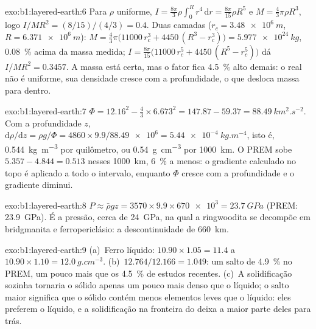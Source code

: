 \begin{solution}{exo:b1:layered-earth:6}
Para $\rho$ uniforme, $I = \tfrac{8\pi}{3}\rho\int_0^R r^4\,\mathrm dr =
\tfrac{8\pi}{15}\rho R^5$ e $M = \tfrac43\pi\rho R^3$, logo
$I/MR^2 = (8/15)/(4/3) = 0.4$. Duas camadas ($r_c = \qty{3.48e6}{m}$,
$R = \qty{6.371e6}{m}$): $M = \tfrac43\pi\bigl(11000\,r_c^3 + 4450\,(R^3 -
r_c^3)\bigr) = \qty{5.977e24}{kg}$, \qty{0.08}{\percent} acima da massa
medida; $I = \tfrac{8\pi}{15}\bigl(11000\,r_c^5 + 4450\,(R^5 - r_c^5)\bigr)$ dá
$I/MR^2 = 0.3457$. A massa está certa, mas o fator fica \qty{4.5}{\percent}
alto demais: o  real não é uniforme, sua densidade cresce com a profundidade, o que
desloca massa para dentro.
\end{solution}

\begin{solution}{exo:b1:layered-earth:7}
$\Phi = 12.16^2 - \tfrac43\times6.673^2 = 147.87 - 59.37 =
\qty{88.49}{km^2.s^{-2}}$. Com a profundidade $z$,
$\mathrm d\rho/\mathrm dz = \rho g/\Phi = 4860\times9.9/\num{88.49e6} =
\qty{5.44e-4}{kg.m^{-4}}$, isto é, \qty{0.544}{kg.m^{-3}} por quilômetro, ou
\qty{0.54}{g.cm^{-3}} por \qty{1000}{km}. O PREM sobe $5.357 - 4.844 =
0.513$ nesses \qty{1000}{km}, \qty{6}{\percent} a menos: o gradiente
calculado no topo é aplicado a todo o intervalo, enquanto $\Phi$ cresce com
a profundidade e o gradiente diminui.
\end{solution}

\begin{solution}{exo:b1:layered-earth:8}
$P \approx \bar\rho g z = 3570\times9.9\times\num{670e3} = \qty{23.7}{GPa}$
(PREM: \qty{23.9}{GPa}). É a pressão, cerca de \qty{24}{GPa}, na qual
a ringwoodita se decompõe em bridgmanita e ferropericlásio: a
descontinuidade de \qty{660}{km}.
\end{solution}

\begin{solution}{exo:b1:layered-earth:9}
(a)~Ferro líquido: $10.90\times1.05 = 11.4$ a $10.90\times1.10 =
\qty{12.0}{g.cm^{-3}}$. (b)~$12.764/12.166 = 1.049$: um salto de
\qty{4.9}{\percent} no PREM, um pouco mais que os \qty{4.5}{\percent} de
estudos recentes. (c)~A solidificação sozinha tornaria o sólido apenas um pouco mais denso
que o líquido; o salto maior significa que o sólido contém menos
elementos leves que o líquido: eles preferem o líquido, e a solidificação na
fronteira do  deixa a maior parte deles para trás.
\end{solution}

